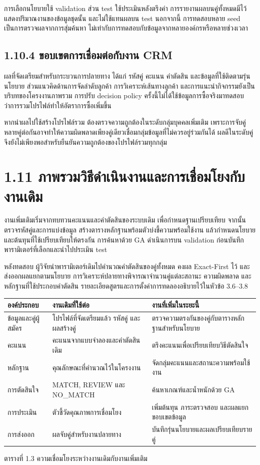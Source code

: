 \documentclass[12pt,a4paper]{report}
\begin{document}
การเลือกนโยบายใช้ validation ส่วน test ใช้ประเมินหลังตรึงค่า การรายงานผลบนคู่ทั้งหมดมีไว้แสดงปริมาณงานของข้อมูลชุดนั้น และไม่ใช้แทนผลบน test นอกจากนี้ การทดสอบหลาย seed เป็นการตรวจผลจากการสุ่มค้นหา ไม่เท่ากับการทดสอบกับข้อมูลจากหลายองค์กรหรือหลายช่วงเวลา

\subsection*{1.10.4 ขอบเขตการเชื่อมต่อกับงาน CRM}
ผลที่จัดเตรียมสำหรับกระบวนการปลายทาง ได้แก่ รหัสคู่ คะแนน คำตัดสิน และข้อมูลที่ใช้ติดตามรุ่นนโยบาย ส่วนแนวคิดด้านการจัดลำดับลูกค้า การวิเคราะห์เส้นทางลูกค้า และการแนะนำกิจกรรมยังเป็นบริบทของโครงงานภาพรวม การปรับ decision policy ครั้งนี้ไม่ได้ใช้ข้อมูลการซื้อจริงมาทดสอบว่าการรวมโปรไฟล์ทำให้อัตราการซื้อเพิ่มขึ้น

หากนำผลไปใช้สร้างโปรไฟล์รวม ต้องตรวจความถูกต้องในระดับกลุ่มบุคคลเพิ่มเติม เพราะการจับคู่หลายคู่ต่อกันอาจทำให้ความผิดพลาดเพียงคู่เดียวเชื่อมกลุ่มข้อมูลที่ไม่ควรอยู่ร่วมกันได้ ผลดีในระดับคู่จึงยังไม่เพียงพอสำหรับยืนยันความถูกต้องของโปรไฟล์รวมทุกกลุ่ม

\section*{1.11 ภาพรวมวิธีดำเนินงานและการเชื่อมโยงกับงานเดิม}
งานเพิ่มเติมเริ่มจากทบทวนคะแนนและคำตัดสินของระบบเดิม เพื่อกำหนดฐานเปรียบเทียบ จากนั้นตรวจรหัสคู่และการแบ่งข้อมูล สร้างตารางหลักฐานพร้อมตัวบ่งชี้ความพร้อมใช้งาน แล้วกำหนดนโยบายและต้นทุนที่ใช้เปรียบเทียบให้ตรงกัน การค้นหาด้วย GA ดำเนินการบน validation ก่อนบันทึกพารามิเตอร์ที่เลือกและนำไปประเมิน test

หลังทดสอบ ผู้วิจัยนำพารามิเตอร์เดิมไปคำนวณคำตัดสินของคู่ทั้งหมด คงผล Exact-First ไว้ และส่งออกผลแยกตามนโยบาย การวิเคราะห์ปลายทางพิจารณาจำนวนคู่แต่ละสถานะ ความผิดพลาด และหลักฐานที่ใช้ประกอบคำตัดสิน รายละเอียดสูตรและการตั้งค่าการทดลองอธิบายไว้ในหัวข้อ 3.6--3.8

\begin{center}\small
\begin{tabularx}{\linewidth}{p{3cm}XX}
\toprule
องค์ประกอบ & งานเดิมที่ใช้ต่อ & งานที่เพิ่มในระยะนี้ \\
\midrule
ข้อมูลและคู่ผู้สมัคร & โปรไฟล์ที่จัดเตรียมแล้ว รหัสคู่ และผลสร้างคู่ & ตรวจความตรงกันของคู่กับตารางหลักฐานสำหรับนโยบาย \\
คะแนน & คะแนนจากแบบจำลองและคำตัดสินเดิม & ตรึงคะแนนเพื่อเปรียบเทียบวิธีตัดสินใจ \\
หลักฐาน & คุณลักษณะที่คำนวณไว้ในโครงงาน & จัดกลุ่มคะแนนและสถานะความพร้อมใช้งาน \\
การตัดสินใจ & MATCH, REVIEW และ NO\_MATCH & ค้นหาเกณฑ์และน้ำหนักด้วย GA \\
การประเมิน & ตัวชี้วัดคุณภาพการเชื่อมโยง & เพิ่มต้นทุน ภาระตรวจสอบ และผลแยกขอบเขตข้อมูล \\
การส่งออก & ผลจับคู่สำหรับงานปลายทาง & บันทึกรุ่นนโยบายและผลเปรียบเทียบรายคู่ \\
\bottomrule
\end{tabularx}
\par ตารางที่ 1.3 ความเชื่อมโยงระหว่างงานเดิมกับงานเพิ่มเติม
\end{center}
\end{document}
